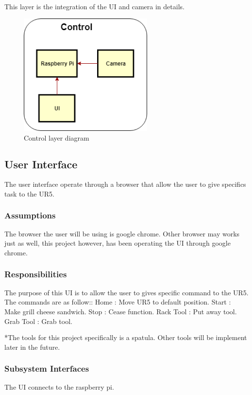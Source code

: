 This layer is the integration of the UI and camera in details.

\begin{figure}[h!]
	\centering
 	\includegraphics[width=0.60\textwidth]{images/Control_Layer}
 \caption{Control layer diagram}
\end{figure}

\subsection{User Interface}
The user interface operate through a browser that allow the user to give specifics task to the UR5.

\subsubsection{Assumptions}
The browser the user will be using is google chrome. Other browser may works just as well, this project however, has been operating the UI through google chrome.

\subsubsection{Responsibilities}
The purpose of this UI is to allow the user to gives specific command to the UR5. The commands are as follow::
	Home  		: Move UR5 to default position.
	Start 		: Make grill cheese sandwich.
	Stop  		: Cease function.
	Rack Tool 	: Put away tool.
	Grab Tool 	: Grab tool.
	
*The tools for this project specifically is a spatula. Other tools will be implement later in the future.

\subsubsection{Subsystem Interfaces}
The UI connects to the raspberry pi.


